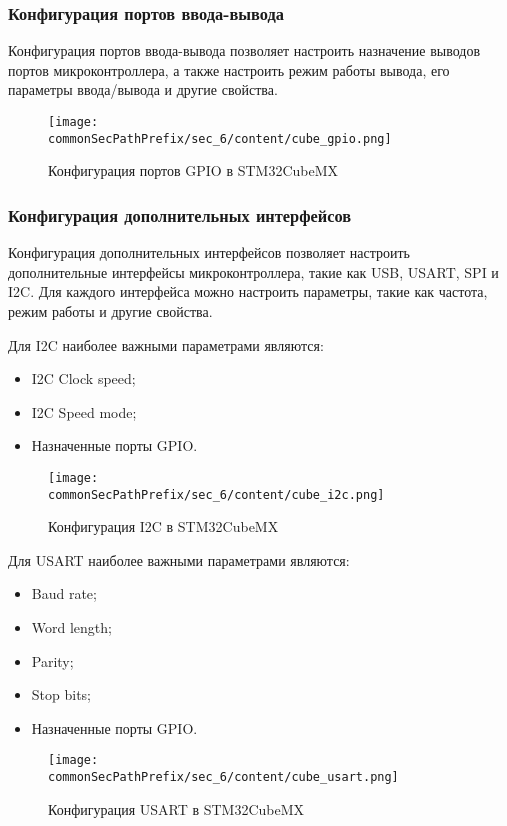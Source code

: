 \subsubsection{Конфигурация портов ввода-вывода}
Конфигурация портов ввода-вывода позволяет настроить назначение выводов портов микроконтроллера, а также настроить режим работы вывода, его параметры ввода/вывода и другие свойства.
\begin{figure}[ht]
    \centering
    \texttt{[image: \\commonSecPathPrefix/sec\_6/content/cube\_gpio.png]}
    \caption{Конфигурация портов GPIO в STM32CubeMX}
\end{figure}


\subsubsection{Конфигурация дополнительных интерфейсов}
Конфигурация дополнительных интерфейсов позволяет настроить дополнительные интерфейсы микроконтроллера, такие как USB, USART, SPI и I2C. Для каждого интерфейса можно настроить параметры, такие как частота, режим работы и другие свойства.

Для I2C наиболее важными параметрами являются:
\begin{itemize}
    \item I2C Clock speed;
    \item I2C Speed mode;
    \item Назначенные порты GPIO.
\end{itemize}
\begin{figure}[ht]
    \centering
    \texttt{[image: \\commonSecPathPrefix/sec\_6/content/cube\_i2c.png]}
    \caption{Конфигурация I2C в STM32CubeMX}
\end{figure}
Для USART наиболее важными параметрами являются:
\begin{itemize}
    \item Baud rate;
    \item Word length;
    \item Parity;
    \item Stop bits;
    \item Назначенные порты GPIO.
\end{itemize}
\begin{figure}[ht]
    \centering
    \texttt{[image: \\commonSecPathPrefix/sec\_6/content/cube\_usart.png]}
    \caption{Конфигурация USART в STM32CubeMX}
\end{figure}